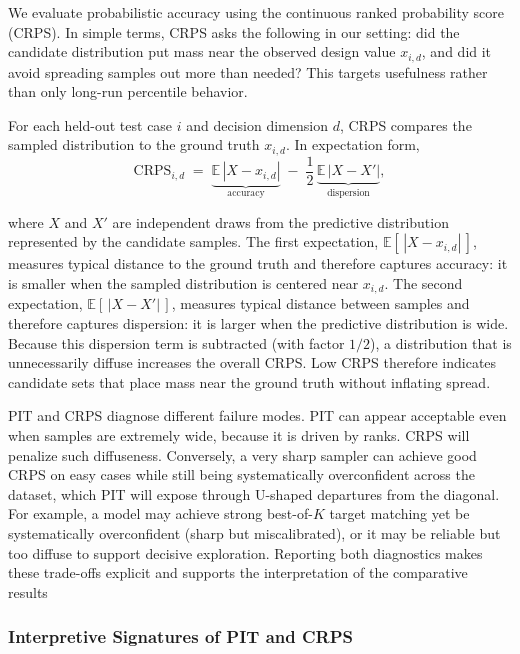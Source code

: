 We evaluate probabilistic accuracy using the continuous ranked probability score (CRPS).
In simple terms, CRPS asks the following in our setting:
did the candidate distribution put mass near the observed design value $x_{i,d}$, and did it
avoid spreading samples out more than needed? This targets usefulness rather than only
long-run percentile behavior. \cite{GneitingRaftery2007,Hersbach2000}

For each held-out test case $i$ and decision dimension $d$, CRPS compares the sampled
distribution to the ground truth $x_{i,d}$. In expectation form,
\begin{equation}
  \mathrm{CRPS}_{i,d}
  \;=\;
  \underbrace{\mathbb{E}\,|X-x_{i,d}|}_{\text{accuracy}}
  \;-\;
  \frac{1}{2}\,
  \underbrace{\mathbb{E}\,|X-X'|}_{\text{dispersion}},
  \label{eq:crps_expectation}
\end{equation}

where $X$ and $X'$ are independent draws from the predictive distribution represented by the
candidate samples. The first expectation, $\mathbb{E}[\,|X-x_{i,d}|\,]$, measures typical
distance to the ground truth and therefore captures accuracy: it is smaller when the sampled
distribution is centered near $x_{i,d}$. The second expectation, $\mathbb{E}[\,|X-X'|\,]$,
measures typical distance between samples and therefore captures dispersion:
it is larger when the predictive distribution is wide. Because this dispersion term is
subtracted (with factor $1/2$), a distribution that is unnecessarily diffuse increases the
overall CRPS. Low CRPS therefore indicates candidate sets that place mass near the ground
truth without inflating spread. \cite{GneitingRaftery2007}



PIT and CRPS diagnose different failure modes. PIT can appear acceptable even when samples
are extremely wide, because it is driven by ranks. CRPS will penalize such diffuseness.
Conversely, a very sharp sampler can achieve good CRPS on easy cases while still being
systematically overconfident across the dataset, which PIT will expose through U-shaped
departures from the diagonal. For example, a model may achieve strong best-of-$K$ target matching yet be systematically overconfident (sharp but miscalibrated), or it may be reliable but too diffuse to support decisive exploration.
Reporting both diagnostics makes these trade-offs explicit and supports the interpretation of the comparative results \cite{Diebold1998}


\subsubsection{Interpretive Signatures of PIT and CRPS}
\label{sec:diagnostic_signatures}

